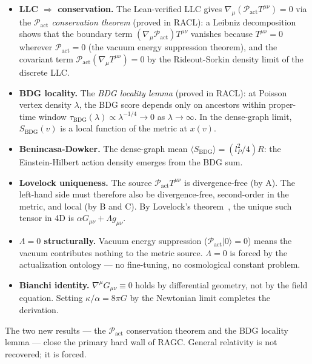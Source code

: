 \documentclass[11pt,a4paper]{article}
\newcommand{\SBDG}{S_{\mathrm{BDG}}}
\newcommand{\Pact}{\mathcal{P}_{\mathrm{act}}}
\begin{document}
\begin{itemize}[noitemsep]
  \item[\textbf{(A)}] \textbf{LLC $\Rightarrow$ conservation.}
  The Lean-verified LLC gives $\nabla_\mu(\Pact T^{\mu\nu}) = 0$
  via the \emph{$\Pact$ conservation theorem} (proved in RACL):
  a Leibniz decomposition shows that the boundary term
  $(\nabla_\mu\Pact)T^{\mu\nu}$ vanishes because $T^{\mu\nu} = 0$
  wherever $\Pact = 0$ (the vacuum energy suppression theorem),
  and the covariant term $\Pact(\nabla_\mu T^{\mu\nu}) = 0$ by
  the Rideout-Sorkin density limit of the discrete LLC.

  \item[\textbf{(B)}] \textbf{BDG locality.}
  The \emph{BDG locality lemma} (proved in RACL): at Poisson vertex
  density $\lambda$, the BDG score depends only on ancestors within
  proper-time window $\tau_{\mathrm{BDG}}(\lambda) \propto \lambda^{-1/4}
  \to 0$ as $\lambda \to \infty$. In the dense-graph limit, $\SBDG(v)$
  is a local function of the metric at $x(v)$.

  \item[\textbf{(C)}] \textbf{Benincasa-Dowker.}
  The dense-graph mean $\langle\SBDG\rangle = (l_P^2/4)R$: the
  Einstein-Hilbert action density emerges from the BDG sum.

  \item[\textbf{(D--E)}] \textbf{Lovelock uniqueness.}
  The source $\Pact T^{\mu\nu}$ is divergence-free (by A). The
  left-hand side must therefore also be divergence-free, second-order
  in the metric, and local (by B and C). By Lovelock's
  theorem~\citep{Lovelock1971}, the unique such tensor in 4D is
  $\alpha G_{\mu\nu} + \Lambda g_{\mu\nu}$.

  \item[\textbf{(F)}] \textbf{$\Lambda = 0$ structurally.}
  Vacuum energy suppression ($\Pact|0\rangle = 0$) means the vacuum
  contributes nothing to the metric source. $\Lambda = 0$ is forced by
  the actualization ontology --- no fine-tuning, no cosmological constant
  problem.

  \item[\textbf{(G)}] \textbf{Bianchi identity.}
  $\nabla^\mu G_{\mu\nu} \equiv 0$ holds by differential geometry,
  not by the field equation. Setting $\kappa/\alpha = 8\pi G$ by
  the Newtonian limit completes the derivation.
\end{itemize}

The two new results --- the $\Pact$ conservation theorem and the BDG
locality lemma --- close the primary hard wall of RAGC. General
relativity is not recovered; it is forced.
\end{document}
